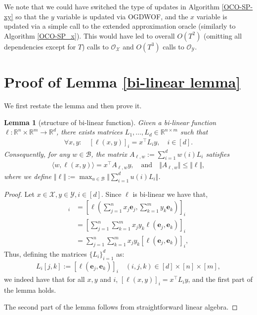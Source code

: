 \documentclass[a4paper,12pt]{article}
\newtheorem{lemma} {Lemma}
\def\e{{\mathbf{e}}}
\newcommand{\mY}{\mathcal{Y}}
\newcommand{\mX}{\mathcal{X}}
\newcommand{\mB}{\mathcal{B}}
\newcommand{\reals}{\mathbb{R}}
\newcommand{\oraclex}{\mathcal{O}_{\mX}}
\newcommand{\oracley}{\mathcal{O}_{\mY}}
\begin{document}
We note that we could have switched the type of updates in Algorithm \ref{OCO-SP-xy} so that the $y$ variable is updated via OGDWOF, and the $x$ variable is updated via a simple call to the extended approximation oracle (similarly to Algorithm \ref{OCO-SP_x}). This would have led to overall $O(T^2)$ (omitting all dependencies except for $T$) calls to $\oraclex$ and $O(T^3)$ calls to $\oracley$.





\appendix

\section{Proof of Lemma \ref{bi-linear lemma}}
We first restate the lemma and then prove it.
\begin{lemma}[structure of bi-linear function]%
Given a bi-linear function $\ell:\reals^n\times\reals^m\rightarrow\reals^d$, there exists matrices $L_1,\dots,L_d\in\reals^{n\times m}$ such that
\begin{align}\label{bi-linear form}
\forall x,y:\quad [\ell (x,y)]_i=x^\top L_i y, \quad i \in [d].
\end{align}
Consequently, for any $w\in\mB$, the matrix $A_{\ell,w} := \sum_{i=1}^dw(i)L_i$ satisfies
\begin{align*}
\langle{w,\ell(x,y)}\rangle = x^{\top}A_{\ell,w}y, \quad \textrm{and} \quad \Vert{A_{\ell,w}}\Vert \leq \Vert{\ell}\Vert,
\end{align*}
where we define $\Vert{\ell}\Vert := \max_{u\in\mB}\Vert{\sum_{i=1}^du(i)L_i}\Vert$.
\end{lemma}

\begin{proof}
Let $x \in \mX , y \in \mY , i \in [d]$. Since $\ell$ is bi-linear we have that,
\begin{align*}
[\ell (x,y)]_i &=\left[\ell \left(\sum_{j=1}^n x_j \e_j,\sum_{k=1}^m y_k \e_k\right)\right]_i \\
&=\left[\sum_{j=1}^n \sum_{k=1}^m x_j y_k \ell (\e_j,\e_k)\right]_i \\
&= \sum_{j=1}^n \sum_{k=1}^m x_j y_k \left[\ell (\e_j,\e_k)\right]_i,
\end{align*}
Thus, defining the matrices $\{L_i\}_{i=1}^d$ as:
\begin{align*}
L_i[j,k] := [\ell (\e_j,\e_k)]_i \quad(i,j,k)\in[d]\times[n]\times[m],
\end{align*}
we indeed have that for all $x,y$ and $i$, $[\ell(x,y)]_i = x^{\top}L_iy$, and the first part of the lemma holds.

The second part of the lemma follows from straightforward linear algebra.
\end{proof}
\end{document}

